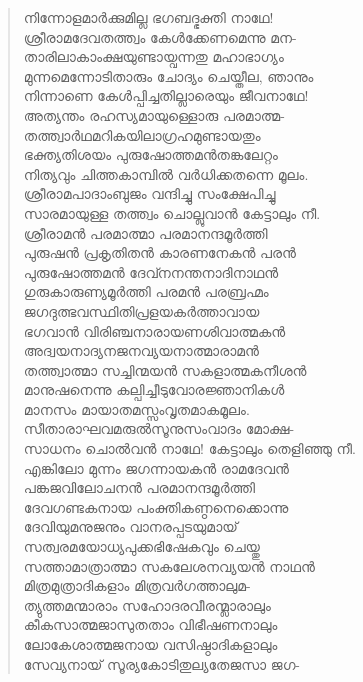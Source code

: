 \begin{verse}
നിന്നോളമാര്‍ക്കുമില്ല ഭഗബദ്ഭക്തി നാഥേ!\\
ശ്രീരാമദേവതത്ത്വം കേള്‍ക്കേണമെന്നു മന-\\
താരിലാകാംക്ഷയുണ്ടായ്വന്നതു മഹാഭാഗ്യം\\
മുന്നമെന്നോടിതാരും ചോദ്യം ചെയ്തീല, ഞാനും\\
നിന്നാണെ കേള്‍പ്പിച്ചതില്ലാരെയും ജീവനാഥേ!\\
അത്യന്തം രഹസ്യമായുള്ളൊരു പരമാത്മ-\\
തത്ത്വാര്‍ഥമറികയിലാഗ്രഹമുണ്ടായതും\\
ഭക്ത്യതിശയം പുരുഷോത്തമന്‍തങ്കലേറ്റം\\
നിത്യവും ചിത്തകാമ്പില്‍ വര്‍ധിക്കതന്നെ മൂലം.\\
ശ്രീരാമപാദാംബുജം വന്ദിച്ചു സംക്ഷേപിച്ചു\\
സാരമായുള്ള തത്ത്വം ചൊല്ലുവാന്‍ കേട്ടാലും നീ.\\
ശ്രീരാമന്‍ പരമാത്മാ പരമാനന്ദമൂര്‍ത്തി\\
പുരുഷന്‍ പ്രകൃതിതന്‍ കാരണനേകന്‍ പരന്‍\\
പുരുഷോത്തമന്‍ ദേവ്നനന്തനാദിനാഥന്‍\\
ഗുരുകാരുണ്യമൂര്‍ത്തി പരമന്‍ പരബ്രഹ്മം\\
ജഗദുത്ഭവസ്ഥിതിപ്രളയകര്‍ത്താവായ\\
ഭഗവാന്‍ വിരിഞ്ചനാരായണശിവാത്മകന്‍\\
അദ്വയനാദ്യനജനവ്യയനാത്മാരാമന്‍\\
തത്ത്വാത്മാ സച്ചിന്മയന്‍ സകളാത്മകനീശന്‍\\
മാനുഷനെന്നു കല്പിച്ചീടുവോരജ്ഞാനികള്‍\\
മാനസം മായാതമസ്സംവൃതമാകമൂലം.\\
സീതാരാഘവമരുല്‍സൂനുസംവാദം മോക്ഷ-\\
സാധനം ചൊല്‍വന്‍ നാഥേ! കേട്ടാലും തെളിഞ്ഞു നീ.\\
എങ്കിലോ മുന്നം ജഗന്നായകന്‍ രാമദേവന്‍\\
പങ്കജവിലോചനന്‍ പരമാനന്ദമൂര്‍ത്തി\\
ദേവഗണ്ടകനായ പംക്തികണ്ഠനെക്കൊന്നു\\
ദേവിയുമനുജനും വാനരപ്പടയുമായ്\\
സത്വരമയോധ്യപുക്കഭിഷേകവും ചെയ്തു\\
സത്താമാത്രാത്മാ സകലേശനവ്യയന്‍ നാഥന്‍\\
മിത്രമുത്രാദികളാം മിത്രവര്‍ഗത്താലുമ-\\
ത്യുത്തമന്മാരാം സഹോദരവീരന്മ്ലാരാലും\\
കീകസാത്മജാസുതതാം വിഭീഷണനാലും\\
ലോകേശാത്മജനായ വസിഷ്ഠാദികളാലും\\
സേവ്യനായ് സൂര്യകോടിതുല്യതേജസാ ജഗ-\\

\end{verse}
